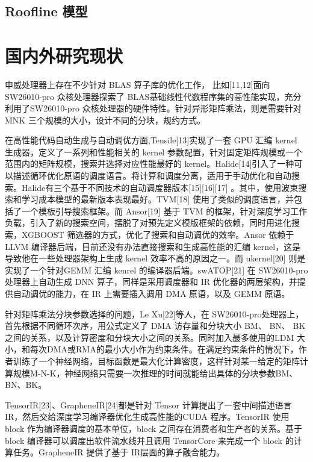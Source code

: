 \subsection{Roofline 模型}




\section{国内外研究现状}

申威处理器上存在不少针对 BLAS 算子库的优化工作， 比如[11,12]面向 SW26010-pro 众核处理器探索了 BLAS基础线性代数程序集的高性能实现，充分利用了SW26010-pro 众核处理器的硬件特性。针对异形矩阵乘法，则是需要针对 MNK 三个规模的大小，设计不同的分块，规约方式。

在高性能代码自动生成与自动调优方面,Tensile[13]实现了一套 GPU 汇编 kernel 生成器，定义了一系列和性能相关的 kernel 参数配置，针对固定矩阵规模或一个范围内的矩阵规模，搜索并选择对应性能最好的 kernel。Halide[14]引入了一种可以描述循环优化原语的调度语言。将计算和调度分离，适用于手动优化和自动搜索。Halide有三个基于不同技术的自动调度器版本[15][16][17] 。其中，使用波束搜索和学习成本模型的最新版本表现最好。TVM[18] 使用了类似的调度语言，并包括了一个模板引导搜索框架。而 Ansor[19] 基于 TVM 的框架，针对深度学习工作负载，引入了新的搜索空间，摆脱了对预先定义模版框架的依赖，同时用进化搜索，XGBOOST 筛选器的方式，优化了搜索和自动调优的效率。Ansor 依赖于 LLVM 编译器后端，目前还没有办法直接搜索和生成高性能的汇编 kernel，这是导致他在一些处理器架构上生成 kernel 效率不高的原因之一。而 ukernel[20] 则是实现了一个针对GEMM 汇编 kenrel 的编译器后端。swATOP[21] 在 SW26010-pro 处理器上自动生成 DNN 算子，同样是采用调度器和 IR 优化器的两层架构，并提供自动调优的能力，在 IR 上需要插入调用 DMA 原语，以及 GEMM 原语。

针对矩阵乘法分块参数选择的问题，Le Xu[22]等人，在 SW26010-pro处理器上，首先根据不同循环次序，用公式定义了 DMA 访存量和分块大小 BM、 BN、 BK 之间的关系，以及计算密度和分块大小之间的关系。同时加入最多使用的LDM 大小，和每次DMA或RMA的最小大小作为约束条件。在满足约束条件的情况下，作者训练了一个神经网络，目标函数是最大化计算密度，这样针对某一给定的矩阵计算规模M-N-K，神经网络只需要一次推理的时间就能给出具体的分块参数BM、BN、BK。

TensorIR[23]、GrapheneIR[24]都是针对 Tensor 计算提出了一套中间描述语言IR，然后交给深度学习编译器优化生成高性能的CUDA 程序。TensorIR 使用 block 作为编译器调度的基本单位，block 之间存在消费者和生产者的关系。基于 block 编译器可以调度出软件流水线并且调用 TensorCore 来完成一个 block 的计算任务。GrapheneIR 提供了基于 IR层面的算子融合能力。

